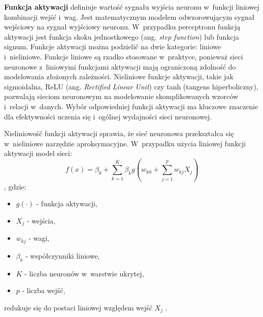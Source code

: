 \textbf{Funkcja aktywacji} definiuje wartość sygnału wyjścia neuronu w~funkcji liniowej kombinacji wejść i~wag. Jest matematycznym modelem odwzorowującym sygnał wejściowy na sygnał wyjściowy neuronu. W~przypadku perceptronu funkcją aktywacji jest funkcja skoku jednostkowego (ang. \textit{step function}) lub funkcja signum. Funkcje aktywacji można podzielić na dwie kategorie: liniowe i~nieliniowe. Funkcje liniowe są rzadko stosowane w~praktyce, ponieważ sieci neuronowe z~liniowymi funkcjami aktywacji mają ograniczoną zdolność do modelowania złożonych zależności. Nieliniowe funkcje aktywacji, takie jak sigmoidalna, ReLU (ang. \textit{Rectified Linear Unit}) czy tanh (tangens hiperboliczny), pozwalają sieciom neuronowym na modelowanie skomplikowanych wzorców i~relacji w~danych. Wybór odpowiedniej funkcji aktywacji ma kluczowe znaczenie dla efektywności uczenia się i~ogólnej wydajności sieci neuronowej.

Nieliniowość funkcji aktywacji sprawia, że sieć neuronowa przekształca się w~nieliniowe narzędzie aproksymacyjne. W~przypadku użycia liniowej funkcji aktywacji model sieci: 
\[f(x)= \beta_0 +\sum_{k=1}^{K}{\beta_k g(w_{k0}+\sum_{j=1}^{p}{w_{kj}X_j})}\],
gdzie: 
\begin{itemize}
    \item $g(\cdot)$ - funkcja aktywacji,
    \item $X_j$ - wejścia,
    \item $w_{kj}$ - wagi,
    \item $\beta_k$ - współczynniki liniowe,
    \item $K$ - liczba neuronów w~warstwie ukrytej,
    \item $p$ - liczba wejść,
\end{itemize}
redukuje się do postaci liniowej względem wejść $X_j$ \cite{islp}.

